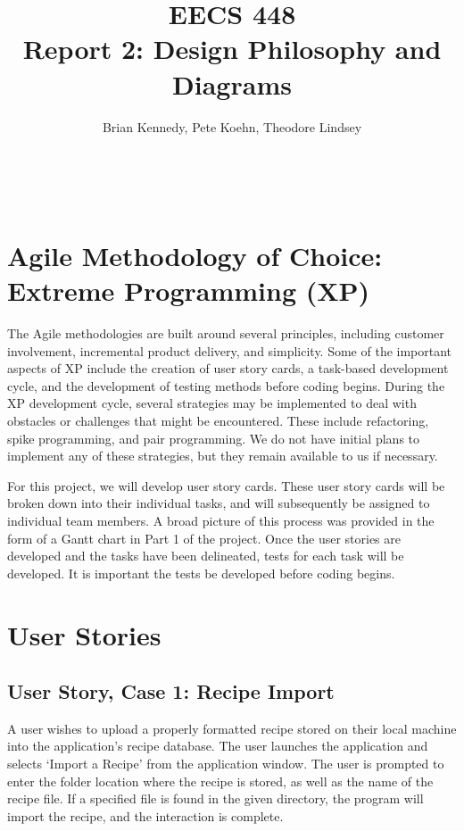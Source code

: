 \documentclass[landscape]{article}
\author{Brian Kennedy, Pete Koehn, Theodore Lindsey}
\title{EECS 448 \\ Report 2: Design Philosophy and Diagrams}
\begin{document}
\maketitle

\vfill

\tableofcontents

\newpage

\

\newpage

\section{Agile Methodology of Choice: Extreme Programming (XP)}

The Agile methodologies are built around several principles, including customer involvement, incremental product delivery, and simplicity. Some of the important aspects of XP include the creation of user story cards, a task-based development cycle, and the development of testing methods before coding begins. During the XP development cycle, several strategies may be implemented to deal with obstacles or challenges that might be encountered. These include refactoring, spike programming, and pair programming. We do not have initial plans to implement any of these strategies, but they remain available to us if necessary.

For this project, we will develop user story cards. These user story cards will be broken down into their individual tasks, and will subsequently be assigned to individual team members. A broad picture of this process was provided in the form of a Gantt chart in Part 1 of the project. Once the user stories are developed and the tasks have been delineated, tests for each task will be developed. It is important the tests be developed before coding begins.

\section{User Stories}
\subsection{User Story, Case 1: Recipe Import}

A user wishes to upload a properly formatted recipe stored on their local machine into the application's recipe database. The user launches the application and selects `Import a Recipe' from the application window. The user is prompted to enter the folder location where the recipe is stored, as well as the name of the recipe file. If a specified file is found in the given directory, the program will import the recipe, and the interaction is complete.
\end{document}
